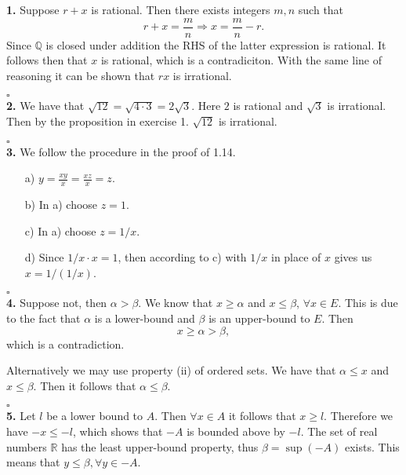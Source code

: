 \documentclass[11pt]{article}
\date{\today}
\title{}
\begin{document}
\noindent\textbf{1.} Suppose $r+x$ is rational.
Then there exists integers $m, n$ such that
\begin{displaymath}
  r + x = \frac{m}{n} \Rightarrow x = \frac{m}{n} - r.
\end{displaymath}
Since $\mathbb{Q}$ is closed under addition the RHS of the latter expression is rational.
It follows then that $x$ is rational, which is a contradiciton.
With the same line of reasoning it can be shown that $rx$ is irrational.

\hfill$\square$\\

\noindent\textbf{2.} We have that $\sqrt{12} = \sqrt{4 \cdot 3} = 2 \sqrt{3}$.
Here $2$ is rational and $\sqrt{3}$ is irrational.
Then by the proposition in exercise 1. $\sqrt{12}$ is irrational.

\hfill$\square$\\

\noindent\textbf{3.} We follow the procedure in the proof of 1.14.
\begin{itemize}
\item [a)] $y = \frac{xy}{x} = \frac{xz}{x} = z.$
\item [b)] In a) choose $z=1$.
\item [c)] In a) choose $z=1/x$.
\item [d)] Since $1/x \cdot x = 1$, then according to c) with $1/x$ in place of $x$ gives us $x=1/(1/x)$.
\end{itemize}

\hfill$\square$\\

\noindent\textbf{4.} Suppose not, then $\alpha > \beta$.
We know that $x \geq \alpha$ and $x \leq \beta$, $\forall x \in E$.
This is due to the fact that $\alpha$ is a lower-bound and $\beta$ is an upper-bound to $E$.
Then
\begin{displaymath}
  x \geq \alpha > \beta,
\end{displaymath}
which is a contradiction.

Alternatively we may use property (ii) of ordered sets.
We have that $\alpha \leq x$ and $x \leq \beta$.
Then it follows that $\alpha \leq \beta$.

\hfill$\square$\\

\noindent\textbf{5.} Let $l$ be a lower bound to $A$.
Then $\forall x \in A$ it follows that $x \geq l$.
Therefore we have $-x \leq -l$, which shows that $-A$ is bounded above by $-l$.
The set of real numbers $\mathbb{R}$ has the least upper-bound property, thus $\beta = \sup{(-A)}$ exists.
This means that $y \leq \beta, \forall y\in -A$.
\end{document}
